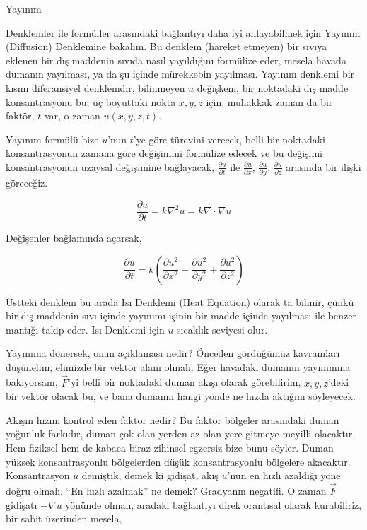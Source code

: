 \documentclass[12pt,fleqn]{article}\usepackage{../../common}
\begin{document}
Yayınım

Denklemler ile formüller arasındaki bağlantıyı daha iyi anlayabilmek için
Yayınım (Diffusion) Denklemine bakalım. Bu denklem (hareket etmeyen) bir sıvıya
eklenen bir dış maddenin sıvıda nasıl yayıldığını formülize eder, mesela havada
dumanın yayılması, ya da şu içinde mürekkebin yayılması. Yayınım denklemi bir
kısmı diferansiyel denklemdir, bilinmeyen $u$ değişkeni, bir noktadaki dış madde
konsantrasyonu bu, üç boyuttaki nokta $x,y,z$ için, muhakkak zaman da bir
faktör, $t$ var, o zaman $u(x,y,z,t)$.

Yayınım formülü bize $u$'nun $t$'ye göre türevini verecek, belli bir noktadaki
konsantrasyonun zamana göre değişimini formülize edecek ve bu değişimi
konsantrasyonun uzaysal değişimine bağlayacak, $\frac{\partial u}{\partial t}$
ile $\frac{\partial u}{\partial x}$, $\frac{\partial u}{\partial y}$,
$\frac{\partial u}{\partial z}$ arasında bir ilişki göreceğiz.

$$
\frac{\partial u}{\partial t} =
k \nabla^2 u =
k \nabla \cdot \nabla u
$$

Değişenler bağlamında açarsak,

$$
\frac{\partial u}{\partial t} = k \left(
\frac{\partial u^2}{\partial x^2} +
\frac{\partial u^2}{\partial y^2} +
\frac{\partial u^2}{\partial z^2}
\right)
$$

Üstteki denklem bu arada Isı Denklemi (Heat Equation) olarak ta bilinir, çünkü
bir dış maddenin sıvı içinde yayınımı işinin bir madde içinde yayılması ile
benzer mantığı takip eder. Isı Denklemi için $u$ sıcaklık seviyesi olur.

Yayınıma dönersek, onun açıklaması nedir? Önceden gördüğümüz kavramları
düşünelim, elimizde bir vektör alanı olmalı. Eğer havadaki dumanın yayınımına
bakıyorsam, $\vec{F}$'yi belli bir noktadaki duman akışı olarak görebilirim,
$x,y,z$'deki bir vektör olacak bu, ve bana dumanın hangi yönde ne hızda aktığını
söyleyecek.

Akışın hızını kontrol eden faktör nedir? Bu faktör bölgeler arasındaki duman
yoğunluk farkıdır, duman çok olan yerden az olan yere gitmeye meyilli olacaktır.
Hem fiziksel hem de kabaca biraz zihinsel egzersiz bize bunu söyler. Duman
yüksek konsantrasyonlu bölgelerden düşük konsantrasyonlu bölgelere akacaktır.
Konsantrasyon $u$ demiştik, demek ki gidişat, akış $u$'nun en hızlı azaldığı
yöne doğru olmalı. ``En hızlı azalmak'' ne demek? Gradyanın negatifi.  O zaman
$\vec{F}$ gidişatı $-\nabla u$ yönünde olmalı, aradaki bağlantıyı direk
orantısal olarak kurabiliriz, bir sabit üzerinden mesela,
\end{document}
